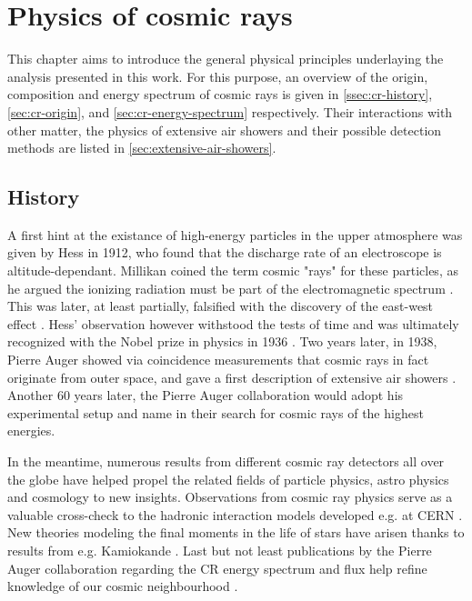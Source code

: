 
\chapter{Physics of cosmic rays}
\label{chap:physical-background}

This chapter aims to introduce the general physical principles underlaying the analysis presented in this work. For this purpose, an overview of the origin, 
composition and energy spectrum of cosmic rays is given in \autoref{ssec:cr-history}, \autoref{sec:cr-origin}, and \autoref{sec:cr-energy-spectrum} respectively. 
Their interactions with other matter, the physics of extensive air showers and their possible detection methods are listed in \autoref{sec:extensive-air-showers}.

\section{History}
\label{ssec:cr-history}

A first hint at the existance of high-energy particles in the upper atmosphere was given by Hess in 1912, who found that the discharge rate of an electroscope is 
altitude-dependant. Millikan coined the term cosmic "rays" for these particles, as he argued the ionizing radiation must be part of the electromagnetic spectrum 
\cite{millikan1928origin}. This was later, at least partially, falsified with the discovery of the east-west effect \cite{johnson1938note}. Hess' observation 
however withstood the tests of time and was ultimately recognized with the Nobel prize in physics in 1936 \cite{nobelprize1936}. Two years later, in 1938, Pierre 
Auger showed via coincidence measurements that cosmic rays in fact originate from outer space, and gave a first description of extensive air showers 
\cite{auger1939extensive}. Another 60 years later, the Pierre Auger collaboration would adopt his experimental setup and name in their search for cosmic rays of 
the highest energies.

In the meantime, numerous results from different cosmic ray detectors all over the globe have helped propel the related fields of particle physics, astro physics 
and cosmology to new insights. Observations from cosmic ray physics serve as a valuable cross-check to the hadronic interaction models developed e.g. at CERN 
\cite{ostapchenko2007status}. New theories modeling the final moments in the life of stars have arisen thanks to results from e.g. Kamiokande 
\cite{goldman1988implications}. Last but not least publications by the Pierre Auger collaboration regarding the CR energy spectrum and flux help refine knowledge of 
our cosmic neighbourhood \cite{abraham2010measurement, aab2015searches}.

